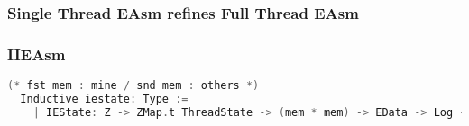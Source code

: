 

\subsubsection{Single Thread EAsm refines Full Thread EAsm}

\subsubsection{IIEAsm}
\begin{lstlisting}[language=C]
  (* fst mem : mine / snd mem : others *)
  Inductive iestate: Type :=
    | IEState: Z -> ZMap.t ThreadState -> (mem * mem) -> EData -> Log -> iestate.
\end{lstlisting}


